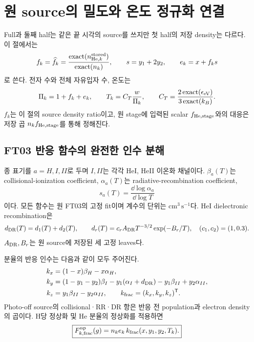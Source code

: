 \section{원 source의 밀도와 온도 정규화 연결}\label{sec:bridge}
Full과 둘째 half는 같은 끝 시각의 source를 쓰지만 첫 half의 저장 density는 다르다. 이 절에서는
\begin{equation}
f_k=\widehat f_k=\frac{\operatorname{exact}(n_{{\rm He},k}^{\rm stored})}{\operatorname{exact}(n_k)},\qquad
s=y_1+2y_2,\qquad e_k=x+f_ks
\end{equation}
로 쓴다. 전자 수와 전체 자유입자 수, 온도는
\begin{equation}
\Pi_k=1+f_k+e_k,\qquad
T_k=C_T\frac{w}{\Pi_k},\qquad
C_T=\frac{2\operatorname{exact}(\epsilon_{\rm eV})}{3\operatorname{exact}(k_B)}.
\label{eq:thermo}
\end{equation}
$f_k$는 이 절의 source density ratio이고, 원 stage에 입력된 scalar $f_{\rm He,stage}$와의 대응은 저장 곱 $n_kf_{\rm He,stage}$를 통해 정해진다.

\subsection{FT03 반응 함수의 완전한 인수 분해}
종 표기를 $a=H,I,II$로 두며 $I,II$는 각각 HeI, HeII 이온화 채널이다.
$\beta_a(T)$는 collisional-ionization coefficient,
$\alpha_a(T)$는 radiative-recombination coefficient,
\[
s_a(T)=\frac{\dd\log\alpha_a}{\dd\log T}
\]
이다. 모든 함수는 원 FT03의 고정 fit이며 계수의 단위는 $\mathrm{cm^3\,s^{-1}}$다. HeI dielectronic recombination은
\begin{equation}
d_{\rm DR}(T)=d_1(T)+d_2(T),\qquad
d_r(T)=c_rA_{\rm DR}T^{-3/2}\exp(-B_r/T),\quad(c_1,c_2)=(1,0.3).
\label{eq:dr}
\end{equation}
$A_{\rm DR},B_r$는 원 source에 저장된 세 고정 leaves다.

분율의 반응 인수는 다음과 같이 모두 주어진다.
\begin{align}
k_x&=(1-x)\beta_H-x\alpha_H,\label{eq:kx}\\
k_y&=(1-y_1-y_2)\beta_I-y_1(\alpha_I+d_{\rm DR})
-y_1\beta_{II}+y_2\alpha_{II},\label{eq:ky}\\
k_z&=y_1\beta_{II}-y_2\alpha_{II},\qquad
k_{\rm frac}=(k_x,k_y,k_z)^{\mathsf T}.
\label{eq:kz}
\end{align}
Photo-off source의 collisional·RR·DR 항은 반응 전 population과 electron density의 곱이다. H당 정상화 및 He 분율의 정상화를 적용하면
\begin{equation}
\boxed{F^{\rm np}_{k,{\rm frac}}(g)
=n_ke_k\,k_{\rm frac}(x,y_1,y_2,T_k).}
\label{eq:npfrac}
\end{equation}

